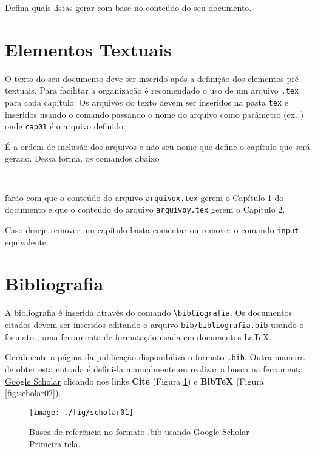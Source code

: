 Defina quais listas gerar com base no conteúdo do seu documento.

\section{Elementos Textuais}
\label{sec:textuais}

O texto do seu documento deve ser inserido após a definição dos elementos pré-textuais. Para facilitar a organização é recomendado o uso de um arquivo \verb|.tex| para cada capítulo. Os arquivos do texto devem ser inseridos na pasta \verb|tex| e inseridos usando o comando \verb|| passando o nome do arquivo como parâmetro (ex. \verb||) onde \verb|cap01| é o arquivo definido.

É a ordem de inclusão dos arquivos e não seu nome que define o capítulo que será gerado. Dessa forma, os comandos abaixo

\begin{Verbatim}


\end{Verbatim}

farão com que o conteúdo do arquivo \verb|arquivox.tex| gerem o Capítulo 1 do documento e que o conteúdo do arquivo \verb|arquivoy.tex| gerem o Capítulo 2. 

Caso deseje remover um capítulo basta comentar ou remover o comando \verb|input| equivalente.

\section{Bibliografia}
\label{sec:bib}

A bibliografia é inserida através do comando \verb|\bibliografia|. Os documentos citados devem ser inseridos editando o arquivo \verb|bib/bibliografia.bib| usando o formato \BibTeX, uma ferramenta de formatação usada em documentos \LaTeX. 

Geralmente a página da publicação disponibiliza o formato \verb|.bib|. Outra maneira de obter esta entrada é defini-la manualmente ou realizar a busca na ferramenta \href{https://scholar.google.com}{Google Scholar} clicando nos links \textbf{Cite} (Figura \ref{fig:scholar01}) e \textbf{BibTeX} (Figura \ref{fig:scholar02}). 

\begin{figure}[H]
  \centering
  \texttt{[image: ./fig/scholar01]}
  \caption[Busca de referência - Primeira tela]{Busca de referência no formato .bib usando Google Scholar - Primeira tela.}
  \label{fig:scholar01}
\end{figure}

